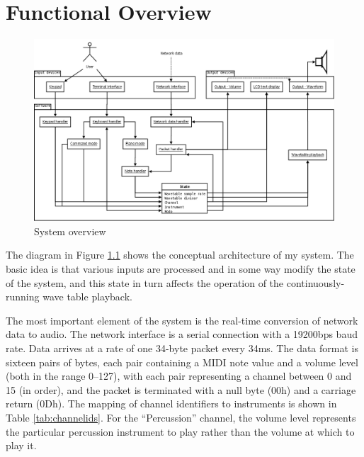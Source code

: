\chapter{Functional Overview}

\begin{nowordcount}
\begin{figure}[htbp]
\centering
\includegraphics[totalheight=0.55\textheight,angle=90]{images/overview.png}
\caption{System overview}\label{fig:systemoverview}
\end{figure}
\end{nowordcount}

The diagram in Figure \ref{fig:systemoverview} shows the conceptual architecture of my system.  The 
basic idea is that various inputs are processed and in some way modify the state of the system, and 
this state in turn affects the operation of the continuously-running wave table playback.

The most important element of the system is the real-time conversion of network data to audio.  The 
network interface is a serial connection with a 19200bps baud rate.  Data arrives at a rate of one 
34-byte packet every 34ms.  The data format is sixteen pairs of bytes, each pair containing a MIDI 
note value and a volume level (both in the range 0--127), with each pair representing a channel 
between 0 and 15 (in order), and the packet is terminated with a null byte (00h) and a carriage 
return (0Dh).  The mapping of channel identifiers to instruments is shown in Table 
\ref{tab:channelids}.  For the ``Percussion'' channel, the volume level represents the particular 
percussion instrument to play rather than the volume at which to play it.

